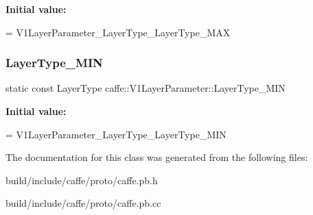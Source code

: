 {\bfseries Initial value\+:}
\begin{DoxyCode}
=
    V1LayerParameter\_LayerType\_LayerType\_MAX
\end{DoxyCode}
\mbox{\label{classcaffe_1_1_v1_layer_parameter_abe306aca3081a594a2da0b5adb791f22}} 
\subsubsection{\texorpdfstring{Layer\+Type\+\_\+\+M\+IN}{LayerType\_MIN}}
{\footnotesize\ttfamily static const Layer\+Type caffe\+::\+V1\+Layer\+Parameter\+::\+Layer\+Type\+\_\+\+M\+IN\hspace{0.3cm}{\ttfamily [static]}}

{\bfseries Initial value\+:}
\begin{DoxyCode}
=
    V1LayerParameter\_LayerType\_LayerType\_MIN
\end{DoxyCode}


The documentation for this class was generated from the following files\+:\begin{DoxyCompactItemize}
\item 
build/include/caffe/proto/caffe.\+pb.\+h\item 
build/include/caffe/proto/caffe.\+pb.\+cc\end{DoxyCompactItemize}
